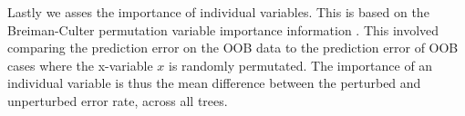 \documentclass{article}
\begin{document}
Lastly we asses the importance of individual variables. This is based on the Breiman-Culter permutation variable importance information \citep{breiman2001random}.  This involved comparing the prediction error on the OOB data to the prediction error of OOB cases where the x-variable $x$ is randomly permutated.  The importance of an individual variable is thus the mean difference between the perturbed and unperturbed error rate, across all trees. 
\end{document}
